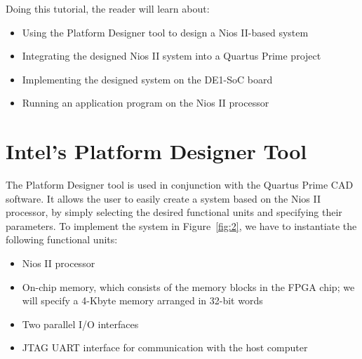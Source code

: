 \documentclass[11pt, twoside, pdftex]{article}
\begin{document}
Doing this tutorial, the reader will learn about:
\begin{itemize}
\item Using the Platform Designer tool to design a Nios II-based system
\item Integrating the designed Nios II system into a Quartus Prime project
\item Implementing the designed system on the DE1-SoC board
\item Running an application program on the Nios II processor
\end{itemize}

\section{Intel's Platform Designer Tool}

The Platform Designer tool is used in conjunction with the Quartus Prime CAD software.
It allows the user to easily create a system based on the Nios II processor, by simply
selecting the desired functional units and specifying their parameters.
To implement the system in Figure~\ref{fig:2}, we have to instantiate the following functional
units:
\begin{itemize}
\item Nios II processor
\item On-chip memory, which consists of the memory blocks in the FPGA chip;
we will specify a 4-Kbyte memory arranged in 32-bit words
\item Two parallel I/O interfaces
\item JTAG UART interface for communication with the host computer
\end{itemize}
\end{document}
